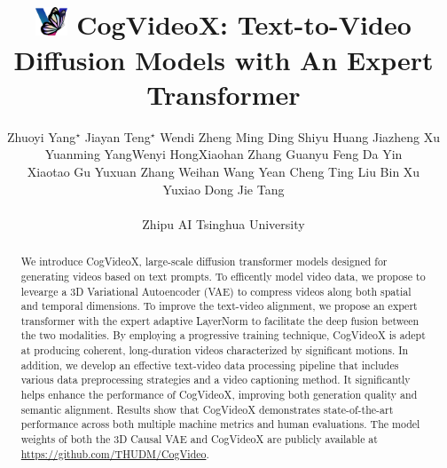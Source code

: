 \documentclass{article}
\title{
\includegraphics[width=0.07\textwidth]{images/logo.png}
CogVideoX: Text-to-Video Diffusion Models with An Expert Transformer}
\author{Zhuoyi Yang$^{\star}$ \aspace  Jiayan Teng$^{\star}$ \aspace  Wendi Zheng  \aspace Ming Ding \aspace  Shiyu Huang \aspace Jiazheng Xu \\
Yuanming Yang\aspace  Wenyi Hong\aspace  Xiaohan Zhang \aspace Guanyu Feng \aspace Da Yin  \\
\aspace Xiaotao Gu  \aspace  Yuxuan Zhang \aspace Weihan Wang  \aspace Yean Cheng  \aspace Ting Liu \aspace   Bin Xu   \aspace \\
  Yuxiao Dong \aspace  Jie Tang \\ 
~\\ 
\textnormal{Zhipu AI \aspace Tsinghua University}
}
\affil[]{}
\newcommand{\model}{CogVideoX\xspace}
\begin{document}
\maketitle

\renewcommand{\thefootnote}{}
\renewcommand{\thefootnote}{\arabic{footnote}}


\begin{abstract}
We introduce \model, large-scale diffusion transformer models designed for generating videos based on text prompts. 
To efficently model video data, we propose to levearge a 3D Variational Autoencoder (VAE) to compress videos along both spatial and temporal dimensions. 
To improve the text-video alignment, we propose an expert transformer with the expert adaptive LayerNorm to facilitate the deep fusion between the two modalities. 
By employing a progressive training technique, \model is adept at producing coherent, long-duration videos characterized by significant motions. 
In addition, we develop an effective text-video data processing pipeline that includes various data preprocessing strategies and a video captioning method. 
It significantly helps enhance the performance of \model, improving both generation quality and semantic alignment. 
Results show that \model demonstrates state-of-the-art performance across both multiple machine metrics and human evaluations. 
The model weights of both the 3D Causal VAE and \model are publicly available at \url{https://github.com/THUDM/CogVideo}. 

\end{abstract}
\end{document}
